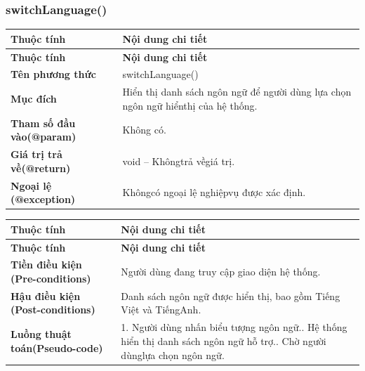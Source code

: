 \subsubsection{switchLanguage()}
\begin{longtable}{|L{0.24\textwidth}|L{0.70\textwidth}|}
\hline
\textbf{Thuộc tính} & \textbf{Nội dung chi tiết} \\
\hline
\endfirsthead
\hline
\textbf{Thuộc tính} & \textbf{Nội dung chi tiết} \\
\hline
\endhead
\textbf{Tên phương thức} & switchLanguage() \\
\hline
\textbf{Mục đích} & Hiển thị danh sách ngôn ngữ để người dùng lựa chọn ngôn ngữ hiển\newline thị của hệ thống. \\
\hline
\textbf{Tham số đầu vào}\newline \textbf{(@param)} & Không có. \\
\hline
\textbf{Giá trị trả về(@return)} & void – Khôngtrả vềgiá trị. \\
\hline
\textbf{Ngoại lệ (@exception)} & Khôngcó ngoại lệ nghiệpvụ được xác định. \\
\hline
\end{longtable}
\vspace{-0.5\baselineskip}
\begin{longtable}{|L{0.24\textwidth}|L{0.70\textwidth}|}
\hline
\textbf{Thuộc tính} & \textbf{Nội dung chi tiết} \\
\hline
\endfirsthead
\hline
\textbf{Thuộc tính} & \textbf{Nội dung chi tiết} \\
\hline
\endhead
\textbf{Tiền điều kiện (Pre-}\newline \textbf{conditions)} & Người dùng đang truy cập giao diện hệ thống. \\
\hline
\textbf{Hậu điều kiện (Post-}\newline \textbf{conditions)} & Danh sách ngôn ngữ được hiển thị, bao gồm Tiếng Việt và Tiếng\newline Anh. \\
\hline
\textbf{Luồng thuật toán}\newline \textbf{(Pseudo-code)} & 1. Người dùng nhấn biểu tượng ngôn ngữ.. Hệ thống hiển thị danh sách ngôn ngữ hỗ trợ.. Chờ người dùnglựa chọn ngôn ngữ. \\
\hline
\end{longtable}
\vspace{-0.5\baselineskip}
